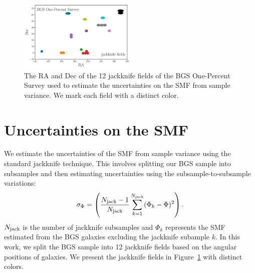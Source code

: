 
\begin{figure}
\begin{center}
    \includegraphics[width=0.5\textwidth]{figs/jackknife_fields.pdf} 
    \caption{
        The RA and Dec of the 12 jackknife fields of the BGS One-Percent Survey
        used to estimate the uncertainties on the SMF from sample variance. 
        We mark each field with a distinct color. 
    }\label{fig:jack}
\end{center}
\end{figure}


\section{Uncertainties on the SMF} \label{sec:uncert}
We estimate the uncertainties of the SMF from sample variance using the
standard jackknife technique. 
This involves splitting our BGS sample into subsamples and then estimating
uncertainties using the subsample-to-subsample variations:  
\begin{equation} \label{eq:jack} 
    \sigma_\Phi = \left(\frac{N_{\rm jack}-1}{N_{\rm jack}}
    \sum\limits_{k=1}^{N_{\rm jack}} (\Phi_k - \Phi)^2 \right).
\end{equation} 
$N_{\rm jack}$ is the number of jackknife subsamples and $\Phi_k$ represents
the SMF estimated from the BGS galaxies excluding the jackknife subample $k$. 
In this work, we split the BGS sample into 12 jackknife fields based on the
angular positions of galaxies. 
We present the jackknife fields in Figure~\ref{fig:jack} with distinct colors. 
